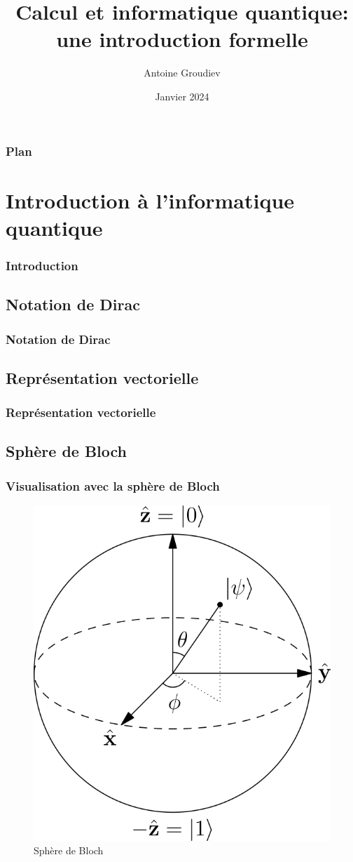 \documentclass[aspectratio=169]{beamer}
\title{\textbf{Calcul et informatique quantique:\\une introduction formelle}}
\author{Antoine Groudiev}
\institute{ENS Ulm}
\date{Janvier 2024}
\theoremstyle{plain}
\theoremstyle{definition}
\begin{document}
\frame{\titlepage}

\begin{frame}
    \frametitle{Plan}
    \tableofcontents
\end{frame}

\section{Introduction à l'informatique quantique}
\begin{frame}
    \frametitle{Introduction}
\end{frame}

\subsection{Notation de Dirac}
\begin{frame}
    \frametitle{Notation de Dirac}
\end{frame}

\subsection{Représentation vectorielle}
\begin{frame}
    \frametitle{Représentation vectorielle}
\end{frame}

\subsection{Sphère de Bloch}
\begin{frame}
    \frametitle{Visualisation avec la sphère de Bloch}
    \begin{figure}[!h]
        \centering
        \includegraphics{bloch-sphere}
        \caption{Sphère de Bloch}
    \end{figure}
\end{frame}
\end{document}
